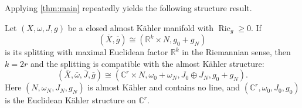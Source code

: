 \documentclass[11pt,twoside]{amsart}
\DeclareMathOperator{\Ric}{Ric}
\newcommand{\R}{\mathbb{R}}
\newcommand{\C}{\mathbb{C}}
\begin{document}
    
Applying \autoref{thm:main} repeatedly yields the following structure result.

\begin{corollary}\label{cor:AK_structure}
    Let $(X,\omega,J,g)$ be a closed almost K\"ahler manifold with
    $\Ric_g \geq 0$. If
    \[
    (\overline X, \overline g) \cong (\mathbb R^k\times N,g_{0}+g_N)
    \]
    is its splitting with maximal Euclidean factor $\R^k$ in the Riemannian sense, then 
    $k=2r$ and the splitting is compatible with the almost K\"ahler structure:
    \[
    (\overline X, \overline \omega, \overline J, \overline g) \cong (\C^r\times N, \omega_{0}+ \omega_N, J_0 \oplus J_N, g_{0}+g_N).
    \]
    Here $(N,\omega_N,J_N,g_N)$ is almost K\"ahler and contains no line, and $(\C^r, \omega_0, J_0, g_0)$ is the Euclidean K\"ahler structure on $\C^r$.
\end{corollary}
\end{document}
